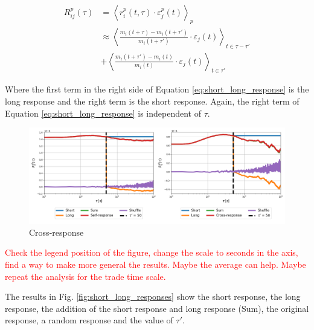 \begin{align}\label{eq:short_long_response}
    R^{p}_{ij}\left(\tau\right)&=\left\langle r^{p}_{i}\left(t, \tau\right)
    \cdot\varepsilon^{p}_{j}\left(t\right)\right\rangle _{p} \nonumber \\
    &\approx\left\langle \frac{m_{i}\left(t+\tau\right)-m_{i}
    \left(t+\tau'\right)} {m_{i}\left(t+\tau'\right)}\cdot\varepsilon_{j}
    \left(t\right)\right\rangle _{t\in\tau-\tau'} \nonumber \\
    & +\left\langle \frac{m_{i}
    \left(t+\tau'\right)-m_{i}\left(t\right)}{m_{i}\left(t\right)}
    \cdot\varepsilon_{j}\left(t\right)\right\rangle _{t\in\tau'}
\end{align}

Where the first term in the right side of Equation \ref{eq:short_long_response}
is the long response and the right term is the short response. Again, the right
term of Equation \ref{eq:short_long_response} is independent of $\tau$.

\begin{figure}[htbp]
    \centering
    \includegraphics[width=\textwidth]
    {figures/05_short_long_AAPL_MSFT.png}
    \caption{Cross-response}
    \label{fig:short_long_cross-response}
\end{figure}

\textcolor{red}{Check the legend position of the figure, change the scale to
                seconds in the axis, find a way to make more general the
                results. Maybe the average can help. Maybe repeat the analysis
                for the trade time scale.}

The results in Fig. \ref{fig:short_long_responses} show the short response, the
long response, the addition of the short response and long response (Sum), the
original response, a random response and the value of $\tau'$.

